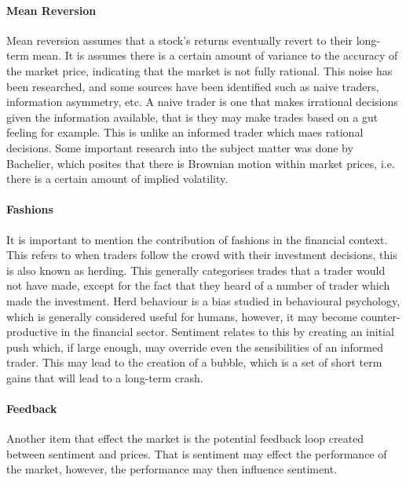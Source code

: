 \paragraph{Mean Reversion}

Mean reversion assumes that a stock's returns eventually revert to their long-term mean\cite{POTERBA198827}. It is assumes there is a certain amount of variance to the accuracy of the market price, indicating that the market is not fully rational. This noise has been researched\cite{fischerNoise}, and some sources have been identified such as naive traders, information asymmetry, etc. A naive trader is one that makes irrational decisions given the information available, that is they may make trades based on a gut feeling for example. This is unlike an informed trader which maes rational decisions. Some important research into the subject matter was done by Bachelier\cite{bachelier1900theorie}, which posites that there is Brownian motion within market prices, i.e. there is a certain amount of implied volatility.

\paragraph{Fashions}

It is important to mention the contribution of fashions in the financial context. This refers to when traders follow the crowd with their investment decisions, this is also known as herding. This generally categorises trades that a trader would not have made, except for the fact that they heard of a number of trader which made the investment. Herd behaviour is a bias studied in behavioural psychology\cite{conformity}, which is generally considered useful for humans, however, it may become counter-productive in the financial sector. Sentiment relates to this by creating an initial push which, if large enough, may override even the sensibilities of an informed trader. This may lead to the creation of a bubble, which is a set of short term gains that will lead to a long-term crash.

\paragraph{Feedback}

Another item that effect the market is the potential feedback loop created between sentiment and prices. That is sentiment may effect the performance of the market, however, the performance may then influence sentiment.

